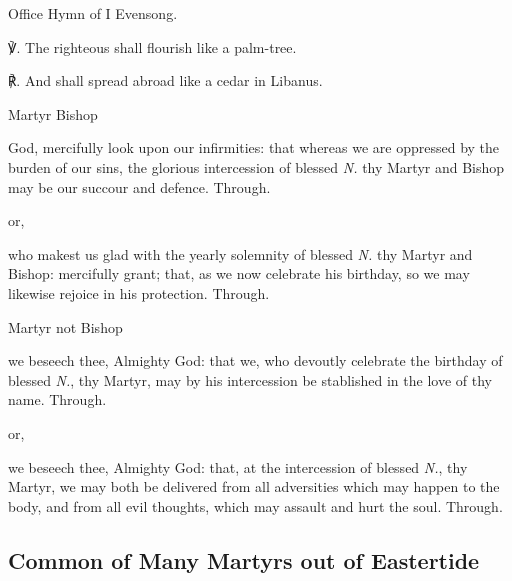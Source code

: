 \secondEvensong


\begin{rubric}
	Office Hymn of I Evensong.
\end{rubric}

℣. The righteous shall flourish like a palm-tree.

℟. And shall spread abroad like a cedar in Libanus.


\collect\label{CommonMartyrBishopCollect}
\begin{inhead}
	Martyr Bishop
\end{inhead}
 God, mercifully look upon our infirmities: that whereas we are oppressed by the burden of our sins, the glorious intercession of blessed \textit{N.} thy Martyr and Bishop may be our succour and defence. Through.
\begin{inhead}
	or,
\end{inhead}
 who makest us glad with the yearly solemnity of blessed \textit{N.} thy Martyr and Bishop: mercifully grant; that, as we now celebrate his birthday, so we may likewise rejoice in his protection. Through.

\begin{inhead}\label{CommonMartyrNotBishopCollect}
	Martyr not Bishop
\end{inhead}
 we beseech thee, Almighty God: that we, who devoutly celebrate the birthday of blessed \textit{N.}, thy Martyr, may by his intercession be stablished in the love of thy name. Through.
\begin{inhead}
	or,
\end{inhead}
 we beseech thee, Almighty God: that, at the intercession of blessed \textit{N.}, thy Martyr, we may both be delivered from all adversities which may happen to the body, and from all evil thoughts, which may assault and hurt the soul. Through.


\clearpage
\subsection{Common of Many Martyrs out of Eastertide}\label{CommonMartyrs}

